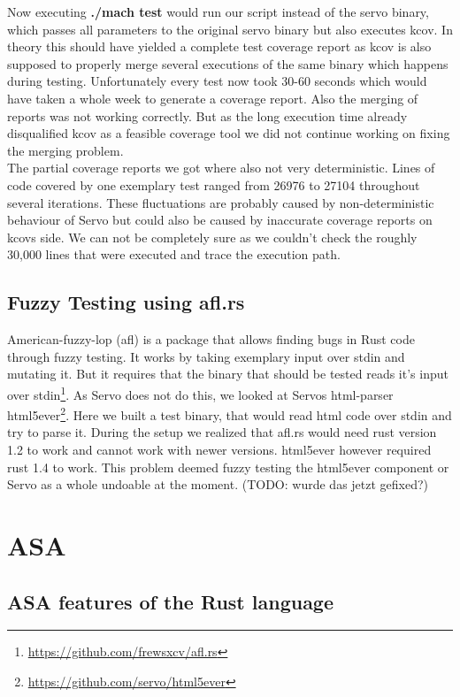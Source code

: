 \documentclass{scrartcl}
\newcommand{\todo}[1] {{\color{red}(TODO: #1)}}
\begin{document}
Now executing \textbf{./mach test} would run our script instead of the servo binary, which passes all parameters to the original servo binary but also executes kcov. In theory this should have yielded a complete test coverage report as kcov is also supposed to properly merge several executions of the same binary which happens during testing. Unfortunately every test now took 30-60 seconds which would have taken a whole week to generate a coverage report. Also the merging of reports was not working correctly. But as the long execution time already disqualified kcov as a feasible coverage tool we did not continue working on fixing the merging problem.\\

The partial coverage reports we got where also not very deterministic. Lines of code covered by one exemplary test ranged from 26976 to 27104 throughout several iterations. These fluctuations are probably caused by non-deterministic behaviour of Servo but could also be caused by inaccurate coverage reports on kcovs side. We can not be completely sure as we couldn't check the roughly 30,000 lines that were executed and trace the execution path.

\subsection{Fuzzy Testing using afl.rs}
American-fuzzy-lop (afl) is a package that allows finding bugs in Rust code through fuzzy testing. It works by taking exemplary input over stdin and mutating it. But it requires that the binary that should be tested reads it's input over stdin\footnote{\url{https://github.com/frewsxcv/afl.rs}}. As Servo does not do this, we looked at Servos html-parser html5ever\footnote{\url{https://github.com/servo/html5ever}}. Here we built a test binary, that would read html code over stdin and try to parse it. During the setup we realized that afl.rs would need rust version 1.2 to work and cannot work with newer versions. html5ever however required rust 1.4 to work. This problem deemed fuzzy testing the html5ever component or Servo as a whole undoable at the moment. \todo{wurde das jetzt gefixed?}




\section{ASA}



\subsection{ASA features of the Rust language} \label{rust_features}
\end{document}
